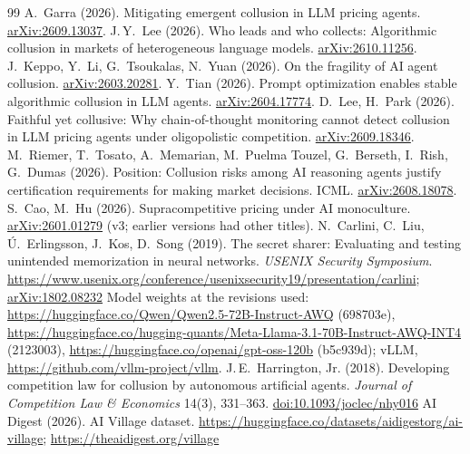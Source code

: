 \documentclass[11pt]{article}
\begin{document}
\begin{thebibliography}{99}
 A.\ Garra (2026). Mitigating emergent collusion in LLM pricing agents. \href{https://arxiv.org/abs/2609.13037}{arXiv:2609.13037}.
 J.\,Y.\ Lee (2026). Who leads and who collects: Algorithmic collusion in markets of heterogeneous language models. \href{https://arxiv.org/abs/2610.11256}{arXiv:2610.11256}.
 J.\ Keppo, Y.\ Li, G.\ Tsoukalas, N.\ Yuan (2026). On the fragility of AI agent collusion. \href{https://arxiv.org/abs/2603.20281}{arXiv:2603.20281}.
 Y.\ Tian (2026). Prompt optimization enables stable algorithmic collusion in LLM agents. \href{https://arxiv.org/abs/2604.17774}{arXiv:2604.17774}.
 D.\ Lee, H.\ Park (2026). Faithful yet collusive: Why chain-of-thought monitoring cannot detect collusion in LLM pricing agents under oligopolistic competition. \href{https://arxiv.org/abs/2609.18346}{arXiv:2609.18346}.
 M.\ Riemer, T.\ Tosato, A.\ Memarian, M.\ Puelma Touzel, G.\ Berseth, I.\ Rish, G.\ Dumas (2026). Position: Collusion risks among AI reasoning agents justify certification requirements for making market decisions. ICML. \href{https://arxiv.org/abs/2608.18078}{arXiv:2608.18078}.
 S.\ Cao, M.\ Hu (2026). Supracompetitive pricing under AI monoculture. \href{https://arxiv.org/abs/2601.01279}{arXiv:2601.01279} (v3; earlier versions had other titles).
 N.\ Carlini, C.\ Liu, \'U.\ Erlingsson, J.\ Kos, D.\ Song (2019). The secret sharer: Evaluating and testing unintended memorization in neural networks. \emph{USENIX Security Symposium}. \url{https://www.usenix.org/conference/usenixsecurity19/presentation/carlini}; \href{https://arxiv.org/abs/1802.08232}{arXiv:1802.08232}
 Model weights at the revisions used: \url{https://huggingface.co/Qwen/Qwen2.5-72B-Instruct-AWQ} (698703e), \url{https://huggingface.co/hugging-quants/Meta-Llama-3.1-70B-Instruct-AWQ-INT4} (2123003), \url{https://huggingface.co/openai/gpt-oss-120b} (b5c939d); vLLM, \url{https://github.com/vllm-project/vllm}.
 J.\,E.\ Harrington, Jr. (2018). Developing competition law for collusion by autonomous artificial agents. \emph{Journal of Competition Law \& Economics} 14(3), 331--363. \href{https://doi.org/10.1093/joclec/nhy016}{doi:10.1093/joclec/nhy016}
 AI Digest (2026). AI Village dataset. \url{https://huggingface.co/datasets/aidigestorg/ai-village}; \url{https://theaidigest.org/village}
\end{thebibliography}
\endgroup
\end{document}
